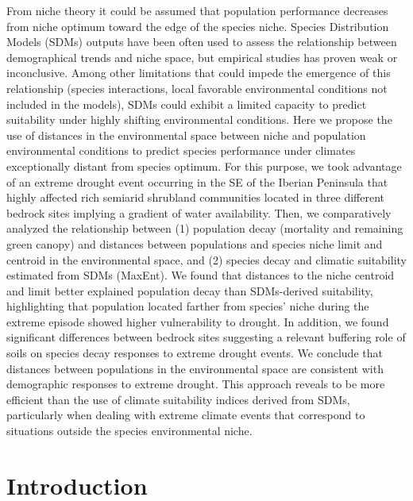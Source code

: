 \documentclass[11pt,twoside]{reedthesis}
\begin{document}
From niche theory it could be assumed that population performance
decreases from niche optimum toward the edge of the species niche.
Species Distribution Models (SDMs) outputs have been often used to
assess the relationship between demographical trends and niche space,
but empirical studies has proven weak or inconclusive. Among other
limitations that could impede the emergence of this relationship
(species interactions, local favorable environmental conditions not
included in the models), SDMs could exhibit a limited capacity to
predict suitability under highly shifting environmental conditions. Here
we propose the use of distances in the environmental space between niche
and population environmental conditions to predict species performance
under climates exceptionally distant from species optimum. For this
purpose, we took advantage of an extreme drought event occurring in the
SE of the Iberian Peninsula that highly affected rich semiarid shrubland
communities located in three different bedrock sites implying a gradient
of water availability. Then, we comparatively analyzed the relationship
between (1) population decay (mortality and remaining green canopy) and
distances between populations and species niche limit and centroid in
the environmental space, and (2) species decay and climatic suitability
estimated from SDMs (MaxEnt). We found that distances to the niche
centroid and limit better explained population decay than SDMs-derived
suitability, highlighting that population located farther from species'
niche during the extreme episode showed higher vulnerability to drought.
In addition, we found significant differences between bedrock sites
suggesting a relevant buffering role of soils on species decay responses
to extreme drought events. We conclude that distances between
populations in the environmental space are consistent with demographic
responses to extreme drought. This approach reveals to be more efficient
than the use of climate suitability indices derived from SDMs,
particularly when dealing with extreme climate events that correspond to
situations outside the species environmental niche.\par  \newpage

\section{Introduction}\label{introduction-3}
\end{document}
